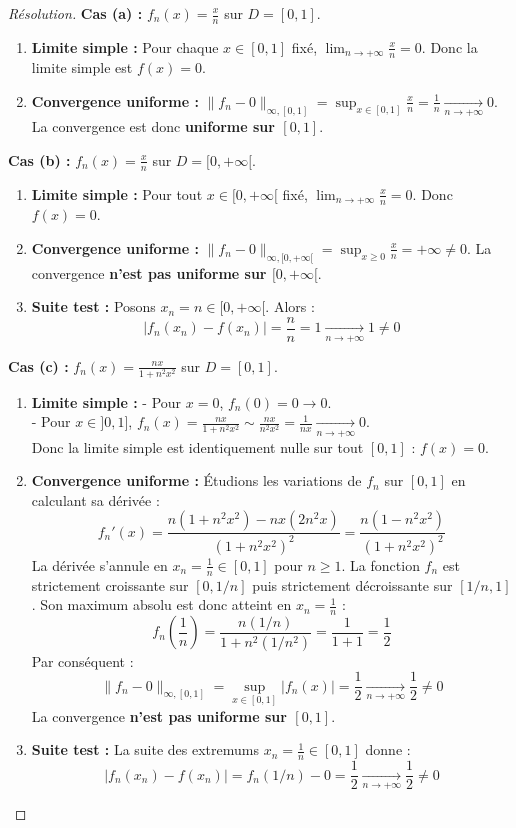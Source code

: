 \documentclass[12pt,a4paper]{report}
\begin{document}
\begin{proof}[Résolution]
\textbf{Cas (a) :} $f_n(x) = \frac{x}{n}$ sur $D = [0, 1]$.
\begin{enumerate}
    \item \textbf{Limite simple :} Pour chaque $x \in [0, 1]$ fixé, $\lim_{n \to +\infty} \frac{x}{n} = 0$. Donc la limite simple est $f(x) = 0$.
    \item \textbf{Convergence uniforme :}
    $\|f_n - 0\|_{\infty, [0, 1]} = \sup_{x \in [0, 1]} \frac{x}{n} = \frac{1}{n} \xrightarrow[n \to +\infty]{} 0$.
    La convergence est donc \textbf{uniforme sur $[0, 1]$}.
\end{enumerate}

\textbf{Cas (b) :} $f_n(x) = \frac{x}{n}$ sur $D = [0, +\infty[$.
\begin{enumerate}
    \item \textbf{Limite simple :} Pour tout $x \in [0, +\infty[$ fixé, $\lim_{n \to +\infty} \frac{x}{n} = 0$. Donc $f(x) = 0$.
    \item \textbf{Convergence uniforme :}
    $\|f_n - 0\|_{\infty, [0, +\infty[} = \sup_{x \ge 0} \frac{x}{n} = +\infty \neq 0$.
    La convergence \textbf{n'est pas uniforme sur $[0, +\infty[$}.
    \item \textbf{Suite test :} Posons $x_n = n \in [0, +\infty[$. Alors :
    \[ |f_n(x_n) - f(x_n)| = \frac{n}{n} = 1 \xrightarrow[n \to +\infty]{} 1 \neq 0 \]
\end{enumerate}

\textbf{Cas (c) :} $f_n(x) = \frac{nx}{1 + n^2 x^2}$ sur $D = [0, 1]$.
\begin{enumerate}
    \item \textbf{Limite simple :}
    - Pour $x = 0$, $f_n(0) = 0 \to 0$.\\
    - Pour $x \in ]0, 1]$, $f_n(x) = \frac{nx}{1 + n^2 x^2} \sim \frac{nx}{n^2 x^2} = \frac{1}{nx} \xrightarrow[n \to +\infty]{} 0$.\\
    Donc la limite simple est identiquement nulle sur tout $[0, 1]$ : $f(x) = 0$.
    \item \textbf{Convergence uniforme :}
    Étudions les variations de $f_n$ sur $[0, 1]$ en calculant sa dérivée :
    \[ f_n'(x) = \frac{n(1 + n^2 x^2) - nx(2 n^2 x)}{(1 + n^2 x^2)^2} = \frac{n(1 - n^2 x^2)}{(1 + n^2 x^2)^2} \]
    La dérivée s'annule en $x_n = \frac{1}{n} \in [0, 1]$ pour $n \ge 1$.
    La fonction $f_n$ est strictement croissante sur $[0, 1/n]$ puis strictement décroissante sur $[1/n, 1]$.
    Son maximum absolu est donc atteint en $x_n = \frac{1}{n}$ :
    \[ f_n\left(\frac{1}{n}\right) = \frac{n(1/n)}{1 + n^2 (1/n^2)} = \frac{1}{1 + 1} = \frac{1}{2} \]
    Par conséquent :
    \[ \|f_n - 0\|_{\infty, [0, 1]} = \sup_{x \in [0, 1]} |f_n(x)| = \frac{1}{2} \xrightarrow[n \to +\infty]{} \frac{1}{2} \neq 0 \]
    La convergence \textbf{n'est pas uniforme sur $[0, 1]$}.
    \item \textbf{Suite test :} La suite des extremums $x_n = \frac{1}{n} \in [0, 1]$ donne :
    \[ |f_n(x_n) - f(x_n)| = f_n(1/n) - 0 = \frac{1}{2} \xrightarrow[n \to +\infty]{} \frac{1}{2} \neq 0 \]
\end{enumerate}


\end{proof}
\end{document}
